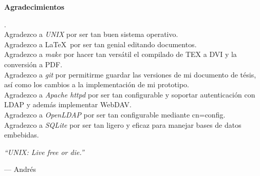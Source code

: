 \begin{center}
\textbf{\large Agradecimientos}
\end{center}
.
\\
Agradezco a \emph{UNIX} por ser tan buen sistema operativo.
\\
Agradezco a \LaTeX\ por ser tan genial editando documentos.
\\
Agradezco a \emph{make} por hacer tan vers\'{a}til el compilado de TEX a DVI y la conversi\'{o}n a PDF.
\\
Agradezco a \emph{git} por permitirme guardar las versiones de mi documento de t\'{e}sis, as\'{i} como los cambios a la implementaci\'{o}n de mi prototipo.
\\
Agradezco a \emph{Apache httpd} por ser tan configurable y soportar autenticaci\'{o}n con LDAP y adem\'{a}s implementar WebDAV.
\\
Agradezco a \emph{OpenLDAP} por ser tan configurable mediante cn=config.
\\
Agradezco a \emph{SQLite} por ser tan ligero y eficaz para manejar bases de datos embebidas.

\vspace{1cm}

\emph{``UNIX: Live free or die.''}

\hfill --- Andr\'{e}s
